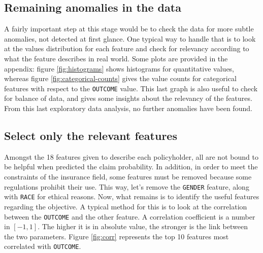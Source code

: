 \documentclass[a4paper,11pt, titlepage]{article}
\begin{document}
\subsection{Remaining anomalies in the data}

A fairly important step at this stage would be to check the data for more subtle anomalies, not detected at first glance. One typical way to handle that is to look at the values distribution for each feature and check for relevancy according to what the feature describes in real world. Some plots are provided in the appendix: figure \ref{fig:histograms} shows histograms for quantitative values, whereas figure \ref{fig:categorical-counts} gives the value counts for categorical features with respect to the {\tt OUTCOME} value. This last graph is also useful to check for balance of data, and gives some insights about the relevancy of the features. From this last exploratory data analysis, no further anomalies have been found.\newline

\subsection{Select only the relevant features}

Amongst the 18 features given to describe each policyholder, all are not bound to be helpful when predicted the claim probability. In addition, in order to meet the constraints of the insurance field, some features must be removed because some regulations prohibit their use. This way, let's remove the {\tt GENDER} feature, along with {\tt RACE} for ethical reasons. Now, what remains is to identify the useful features regarding the objective. A typical method for this is to look at the correlation between the {\tt OUTCOME} and the other feature. A correlation coefficient is a number in $[-1,1]$. The higher it is in absolute value, the stronger is the link between the two parameters. Figure \ref{fig:corr} represents the top 10 features most correlated with {\tt OUTCOME}.
\end{document}
